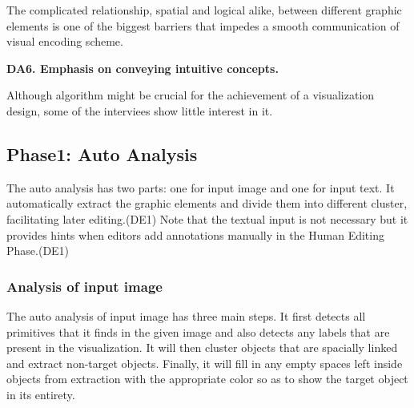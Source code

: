The complicated relationship, spatial and logical alike,  between different graphic elements is one of the biggest barriers that impedes a smooth communication of visual encoding scheme. 


\textbf{DA6. Emphasis on conveying intuitive concepts.} 

 Although algorithm might be crucial for the achievement of a visualization design, some of the interviees show little interest in it. 
 


\subsection{Phase1: Auto Analysis}\par
The auto analysis has two parts: one for input image and one for input text. It automatically extract the graphic elements and divide them into different cluster, facilitating later editing.(DE1) Note that the textual input is not necessary but it provides hints when editors add annotations manually in the Human Editing Phase.(DE1)
 \subsubsection{Analysis of input image}
The auto analysis of input image has three main steps. It first detects all primitives that it finds in the given image and also detects any labels that are present in the visualization. It will then cluster objects that are spacially linked and extract non-target objects. Finally, it will fill in any empty spaces left inside objects from extraction with the appropriate color so as to show the target object in its entirety.

